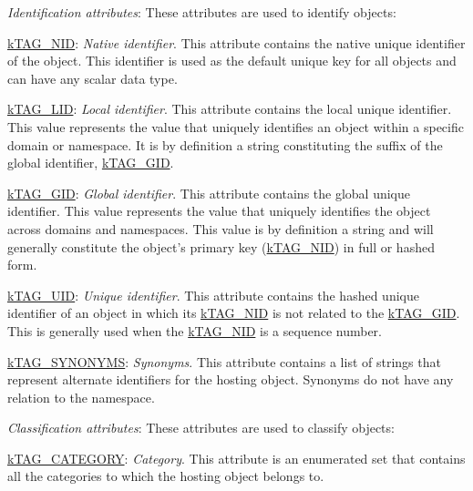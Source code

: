 \begin{DoxyItemize}
\item {\itshape Identification attributes}\-: These attributes are used to identify objects\-: 
\begin{DoxyItemize}
\item {\ttfamily \hyperlink{}{k\-T\-A\-G\-\_\-\-N\-I\-D}}\-: {\itshape Native identifier}. This attribute contains the native unique identifier of the object. This identifier is used as the default unique key for all objects and can have any scalar data type. 
\item {\ttfamily \hyperlink{}{k\-T\-A\-G\-\_\-\-L\-I\-D}}\-: {\itshape Local identifier}. This attribute contains the local unique identifier. This value represents the value that uniquely identifies an object within a specific domain or namespace. It is by definition a string constituting the suffix of the global identifier, \hyperlink{}{k\-T\-A\-G\-\_\-\-G\-I\-D}. 
\item {\ttfamily \hyperlink{}{k\-T\-A\-G\-\_\-\-G\-I\-D}}\-: {\itshape Global identifier}. This attribute contains the global unique identifier. This value represents the value that uniquely identifies the object across domains and namespaces. This value is by definition a string and will generally constitute the object's primary key (\hyperlink{}{k\-T\-A\-G\-\_\-\-N\-I\-D}) in full or hashed form. 
\item {\ttfamily \hyperlink{}{k\-T\-A\-G\-\_\-\-U\-I\-D}}\-: {\itshape Unique identifier}. This attribute contains the hashed unique identifier of an object in which its \hyperlink{}{k\-T\-A\-G\-\_\-\-N\-I\-D} is not related to the \hyperlink{}{k\-T\-A\-G\-\_\-\-G\-I\-D}. This is generally used when the \hyperlink{}{k\-T\-A\-G\-\_\-\-N\-I\-D} is a sequence number. 
\item {\ttfamily \hyperlink{}{k\-T\-A\-G\-\_\-\-S\-Y\-N\-O\-N\-Y\-M\-S}}\-: {\itshape Synonyms}. This attribute contains a list of strings that represent alternate identifiers for the hosting object. Synonyms do not have any relation to the namespace. 
\end{DoxyItemize}
\item {\itshape Classification attributes}\-: These attributes are used to classify objects\-: 
\begin{DoxyItemize}
\item {\ttfamily \hyperlink{}{k\-T\-A\-G\-\_\-\-C\-A\-T\-E\-G\-O\-R\-Y}}\-: {\itshape Category}. This attribute is an enumerated set that contains all the categories to which the hosting object belongs to. 

\end{DoxyItemize}
\end{DoxyItemize}
